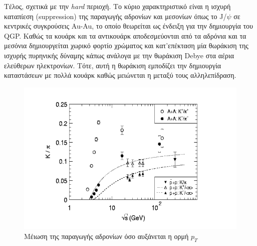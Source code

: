 		Τέλος, σχετικά με την \textit{hard} περιοχή. 
	Το κύριο χαρακτηριστικό είναι η ισχυρή καταπίεση (suppression) της παραγωγής αδρονίων και μεσονίων όπως το J/$\psi$ σε κεντρικές  συγκρούσεις Au-Au, το οποίο θεωρείται ως ένδειξη για την δημιουργία του QGP. Καθώς τα κουάρκ και τα αντικουάρκ αποδεσμεύονται από τα αδρόνια και τα μεσόνια δημιουργείται χωρικό φορτίο χρώματος και κατ'επέκταση μία θωράκιση της ισχυρής πυρηνικής δύναμης κάπως ανάλογα με την θωράκιση Debye στα αέρια ελεύθερων ηλεκτρονίων. Τότε, αυτή η θωράκιση εμποδίζει την δημιουργία καταστάσεων με πολλά κουάρκ καθώς μειώνεται η μεταξύ τους αλληλεπίδραση.
	
\begin{figure}[h!]
	\centering
	\includegraphics[scale=0]{STAR_Results/strange_enhancement}
	\textcolor{white}{\caption{Μέιωση της παραγωγής αδρονίων όσο αυξάνεται η ορμή $p_T$}}
	\label{fig4.11}
\end{figure}


